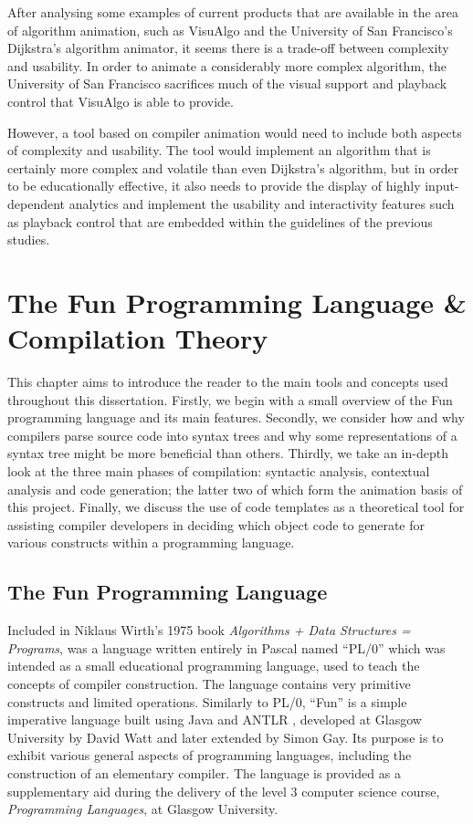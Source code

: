 \documentclass{l4proj}
\begin{document}
After analysing some examples of current products that are available in the area of algorithm animation, such as VisuAlgo and the University of San Francisco's Dijkstra's algorithm animator, it seems there is a trade-off between complexity and usability. In order to animate a considerably more complex algorithm, the University of San Francisco sacrifices much of the visual support and playback control that VisuAlgo is able to provide. 

However, a tool based on compiler animation would need to include both aspects of complexity and usability. The tool would implement an algorithm that is certainly more complex and volatile than even Dijkstra's algorithm, but in order to be educationally effective, it also needs to provide the display of highly input-dependent analytics and implement the usability and interactivity features such as playback control that are embedded within the guidelines of the previous studies.

\chapter{The Fun Programming Language \& Compilation Theory}
This chapter aims to introduce the reader to the main tools and concepts used throughout this dissertation. Firstly, we begin with a small overview of the Fun programming language and its main features. Secondly, we consider how and why compilers parse source code into syntax trees and why some representations of a syntax tree might be more beneficial than others. Thirdly, we take an in-depth look at the three main phases of compilation: syntactic analysis, contextual analysis and code generation; the latter two of which form the animation basis of this project. Finally, we discuss the use of code templates as a theoretical tool for assisting compiler developers in deciding which object code to generate for various constructs within a programming language.

\section{The Fun Programming Language}
Included in Niklaus Wirth's 1975 book {\it Algorithms + Data Structures = Programs}, was a language written entirely in Pascal named ``PL/0'' which was intended as a small educational programming language, used to teach the concepts of compiler construction. The language contains very primitive constructs and limited operations. Similarly to PL/0, ``Fun'' is a simple imperative language built using Java and ANTLR \cite{antlr}, developed at Glasgow University by David Watt and later extended by Simon Gay. Its purpose is to exhibit various general aspects of programming languages, including the construction of an elementary compiler. The language is provided as a supplementary aid during the delivery of the level 3 computer science course, {\it Programming Languages}, at Glasgow University.
\end{document}

